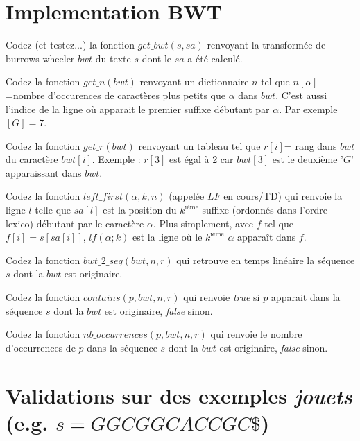 \section*{Implementation BWT}

\qu{}Codez (et testez...) la fonction $get\_bwt(s,sa)$ renvoyant la transformée de burrows wheeler $bwt$ du texte $s$ dont le $sa$ a été calculé.

\qu{}Codez la fonction $get\_n(bwt)$ renvoyant un dictionnaire $n$ tel que $n[\alpha]$=nombre d'occurences de caractères plus petits que $\alpha$ dans $bwt$. C'est aussi l'indice de la ligne où apparait le premier suffixe débutant par $\alpha$. Par exemple $[G] = 7$.

\qu{}Codez la fonction $get\_r(bwt)$ renvoyant un tableau tel que $r[i]$= rang dans $bwt$ du caractère $bwt[i]$. Exemple : $r[3]$ est égal à 2 car $bwt[3]$ est le deuxième '$G$' apparaissant dans $bwt$.


\qu{}Codez la fonction $left\_first (\alpha, k, n)$ (appelée $LF$ en cours/TD) qui renvoie la ligne $l$ telle que $sa[l]$ est la position du $k^{\text{ième}}$ suffixe (ordonnés dans l'ordre lexico) débutant par le caractère $\alpha$. Plus simplement, avec $f$ tel que $f[i]=s[sa[i]]$, $lf (\alpha; k)$ est la ligne où le $k^{\text{ième}}$ $\alpha$ apparaît dans $f$.

\qu{}Codez la fonction $bwt\_2\_seq(bwt, n, r)$ qui retrouve en temps linéaire la séquence $s$ dont la $bwt$ est originaire.

\qu{}Codez la fonction $contains(p, bwt, n, r)$ qui renvoie \emph{true} si $p$ apparait dans la séquence $s$ dont la $bwt$ est originaire, \emph{false} sinon.

\qu{}Codez la fonction $nb\_occurrences(p, bwt, n, r)$ qui renvoie le nombre d'occurrences de $p$ dans la séquence $s$ dont la $bwt$ est originaire, \emph{false} sinon.

\section*{Validations sur des exemples \emph{jouets} (e.g. $s=GGCGGCACCGC\$$)}

